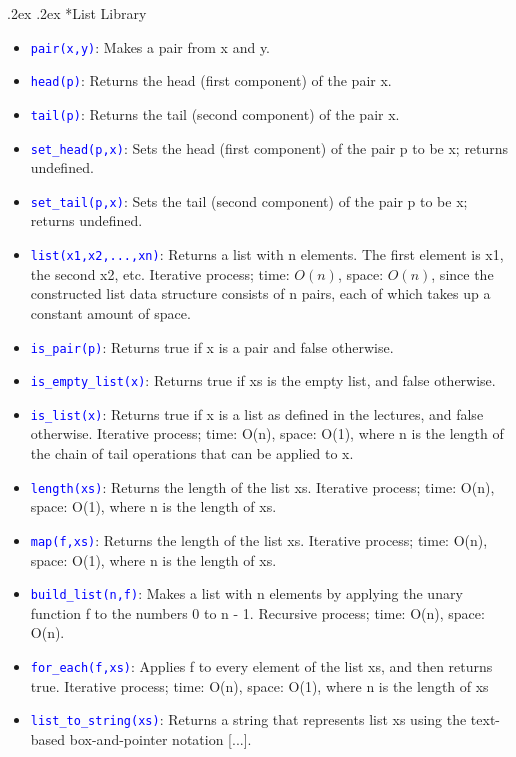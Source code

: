 \documentclass[10pt,portrait,a4paper]{article}
\makeatletter
\newcommand\codeblue[1]{\textcolor{blue}{\code{#1}}}
\def\code#1{\texttt{#1}}
\renewcommand{\subsection}{\@startsection{subsection}{1}{0mm}%
                                {.2ex}%
                                {.2ex}%
                                {\sffamily\bfseries}}
\makeatother
\begin{document}
\begin{multicols*}{4}
  \subsection*{List Library}
    \begin{itemize}
      \item \codeblue{pair(x,y)}: Makes a pair from x and y.
      \item \codeblue{head(p)}: Returns the head (first component) of the pair x.
      \item \codeblue{tail(p)}: Returns the tail (second component) of the pair x.
      \item \codeblue{set\_head(p,x)}: Sets the head (first component) of the pair p to be x; returns undefined.
      \item \codeblue{set\_tail(p,x)}: Sets the tail (second component) of the pair p to be x; returns undefined.
      \item \codeblue{list(x1,x2,...,xn)}: Returns a list with n elements. The first element is x1, the second x2, etc. Iterative process; time: $O(n)$, space: $O(n)$, since the constructed list data structure consists of n pairs, each of which takes up a constant amount of space.
      \item \codeblue{is\_pair(p)}: Returns true if x is a pair and false otherwise.
      \item \codeblue{is\_empty\_list(x)}: Returns true if xs is the empty list, and false otherwise.
      \item \codeblue{is\_list(x)}: Returns true if x is a list as defined in the lectures, and false otherwise. Iterative process; time: O(n), space: O(1), where n is the length of the chain of tail operations that can be applied to x.
      \item \codeblue{length(xs)}: Returns the length of the list xs. Iterative process; time: O(n), space: O(1), where n is the length of xs.
      \item \codeblue{map(f,xs)}: Returns the length of the list xs. Iterative process; time: O(n), space: O(1), where n is the length of xs.
      \item \codeblue{build\_list(n,f)}: Makes a list with n elements by applying the unary function f to the numbers 0 to n - 1. Recursive process; time: O(n), space: O(n).
      \item \codeblue{for\_each(f,xs)}: Applies f to every element of the list xs, and then returns true. Iterative process; time: O(n), space: O(1), where n is the length of xs
      \item \codeblue{list\_to\_string(xs)}: Returns a string that represents list xs using the text-based box-and-pointer notation [...].

\end{itemize}
\end{multicols*}
\end{document}
